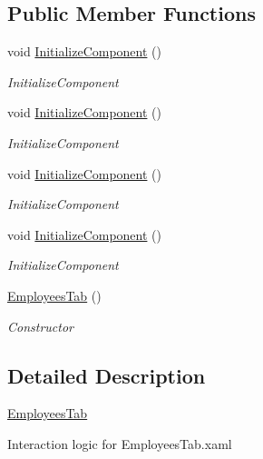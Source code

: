 \subsection*{Public Member Functions}
\begin{DoxyCompactItemize}
\item 
void \hyperlink{class_baudi_1_1_client_1_1_view_1_1_tabs_1_1_employees_tab_a87a924cd9de0d36fdf8b248769e74c69}{Initialize\+Component} ()
\begin{DoxyCompactList}\small\item\em Initialize\+Component \end{DoxyCompactList}\item 
void \hyperlink{class_baudi_1_1_client_1_1_view_1_1_tabs_1_1_employees_tab_a87a924cd9de0d36fdf8b248769e74c69}{Initialize\+Component} ()
\begin{DoxyCompactList}\small\item\em Initialize\+Component \end{DoxyCompactList}\item 
void \hyperlink{class_baudi_1_1_client_1_1_view_1_1_tabs_1_1_employees_tab_a87a924cd9de0d36fdf8b248769e74c69}{Initialize\+Component} ()
\begin{DoxyCompactList}\small\item\em Initialize\+Component \end{DoxyCompactList}\item 
void \hyperlink{class_baudi_1_1_client_1_1_view_1_1_tabs_1_1_employees_tab_a87a924cd9de0d36fdf8b248769e74c69}{Initialize\+Component} ()
\begin{DoxyCompactList}\small\item\em Initialize\+Component \end{DoxyCompactList}\item 
\hyperlink{class_baudi_1_1_client_1_1_view_1_1_tabs_1_1_employees_tab_a930efcadc5b454b3ce2ec7ef78608a87}{Employees\+Tab} ()
\begin{DoxyCompactList}\small\item\em Constructor \end{DoxyCompactList}\end{DoxyCompactItemize}


\subsection{Detailed Description}
\hyperlink{class_baudi_1_1_client_1_1_view_1_1_tabs_1_1_employees_tab}{Employees\+Tab} 

Interaction logic for Employees\+Tab.\+xaml 


